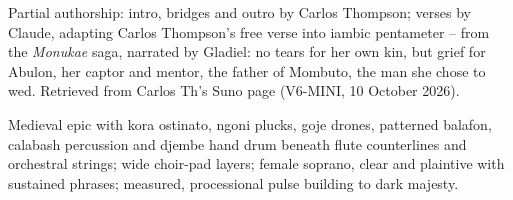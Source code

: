 
\label{sec:paths-of-grief}
\begin{notes}
Partial authorship: intro, bridges and outro by Carlos Thompson; verses by Claude, adapting Carlos Thompson's free verse into iambic pentameter -- from the \emph{Monukae} saga, narrated by Gladiel: no tears for her own kin, but grief for Abulon, her captor and mentor, the father of Mombuto, the man she chose to wed. Retrieved from Carlos Th's Suno page (V6-MINI, 10 October 2026).
\end{notes}
\begin{style}
Medieval epic with kora ostinato, ngoni plucks, goje drones, patterned balafon, calabash percussion and djembe hand drum beneath flute counterlines and orchestral strings; wide choir-pad layers; female soprano, clear and plaintive with sustained phrases; measured, processional pulse building to dark majesty.
\end{style}
